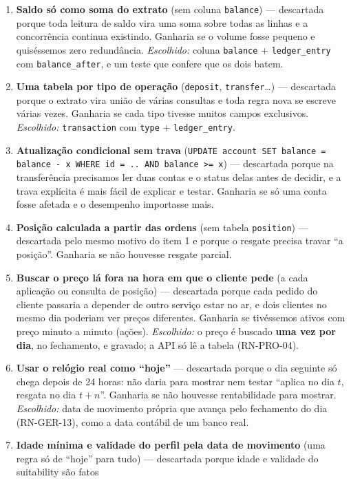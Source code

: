 \documentclass[11pt,a4paper]{article}
\newcommand{\tb}[1]{\texttt{#1}}           %
\begin{document}
\begin{enumerate}
  \item \textbf{Saldo só como soma do extrato} (sem coluna \tb{balance}) --- descartada porque toda
  leitura de saldo vira uma soma sobre todas as linhas e a concorrência continua existindo. Ganharia
  se o volume fosse pequeno e quiséssemos zero redundância. \emph{Escolhido:} coluna \tb{balance}
  + \tb{ledger_entry} com \tb{balance_after}, e um teste que confere que os dois batem.
  \item \textbf{Uma tabela por tipo de operação} (\tb{deposit}, \tb{transfer}\ldots) --- descartada
  porque o extrato vira união de várias consultas e toda regra nova se escreve várias vezes. Ganharia
  se cada tipo tivesse muitos campos exclusivos. \emph{Escolhido:} \tb{transaction} com \tb{type} +
  \tb{ledger_entry}.
  \item \textbf{Atualização condicional sem trava}
  (\tb{UPDATE account SET balance = balance - x WHERE id = .. AND balance >= x}) --- descartada
  porque na transferência precisamos ler duas contas e o status delas antes de decidir, e a trava
  explícita é mais fácil de explicar e testar. Ganharia se só uma conta fosse afetada e o
  desempenho importasse mais.
  \item \textbf{Posição calculada a partir das ordens} (sem tabela \tb{position}) --- descartada pelo
  mesmo motivo do item 1 e porque o resgate precisa travar ``a posição''. Ganharia se não houvesse
  resgate parcial.
  \item \textbf{Buscar o preço lá fora na hora em que o cliente pede} (a cada aplicação ou
  consulta de posição) --- descartada porque cada pedido do cliente passaria a depender de outro
  serviço estar no ar, e dois clientes no mesmo dia poderiam ver preços diferentes. Ganharia se
  tivéssemos ativos com preço minuto a minuto (ações). \emph{Escolhido:} o preço é buscado
  \textbf{uma vez por dia}, no fechamento, e gravado; a API só lê a tabela (RN-PRO-04).
  \item \textbf{Usar o relógio real como ``hoje''} --- descartada porque o dia seguinte só chega
  depois de 24 horas: não daria para mostrar nem testar ``aplica no dia $t$, resgata no dia
  $t+n$''. Ganharia se não houvesse rentabilidade para mostrar. \emph{Escolhido:} data de
  movimento própria que avança pelo fechamento do dia (RN-GER-13), como a data contábil de um
  banco real.
  \item \textbf{Idade mínima e validade do perfil pela data de movimento} (uma regra só de
  ``hoje'' para tudo) --- descartada porque idade e validade do suitability são fatos

\end{enumerate}
\end{document}
